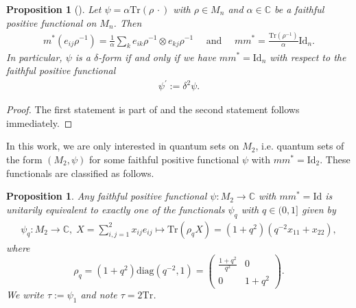 \documentclass{amsart}
\newtheorem{proposition}[thm]{Proposition}
\newcommand{\C}{\mathbb{C}}
\begin{document}
\begin{proposition}[{\cite[Proposition 2.3]{wasilewski_quantum_2024}}]
    \label{pre::prop:delta_form_versus_mm*=Id}
    Let $\psi = \alpha \mathrm{Tr}(\rho \, \cdot)$ with $\rho \in M_n$ and $\alpha \in \C$ be a faithful positive functional on $M_n$. Then
    \begin{align*}
        m^\ast(e_{ij}\rho^{-1}) = \frac{1}{\alpha} \sum_k e_{ik}\rho^{-1} \otimes e_{kj}\rho^{-1}
        \quad \text{ and } \quad
        m m^\ast = \frac{\mathrm{Tr}(\rho^{-1})}{\alpha} \mathrm{Id}_n.
    \end{align*}
    In particular, $\psi$ is a $\delta$-form if and only if we have $m m^\ast = \mathrm{Id}_n$ with respect to the faithful positive functional
    \begin{align*}
        \psi^\prime := \delta^2 \psi.
    \end{align*}
\end{proposition}

\begin{proof}
    The first statement is part of \cite[Proposition 2.3]{wasilewski_quantum_2024} and the second statement follows immediately.
\end{proof}

In this work, we are only interested in quantum sets on $M_2$, i.e. quantum sets of the form $(M_2, \psi)$ for some faithful positive functional $\psi$ with $m m^\ast = \mathrm{Id}_2$. These functionals are classified as follows.

\begin{proposition}
    \label{pre::prop:qsets_on_M2}
    Any faithful positive functional $\psi: M_2 \to \C$ with $mm^\ast = \mathrm{Id}$ is unitarily equivalent to exactly one of the functionals $\psi_q$ with $q \in (0,1]$ given by
    \begin{align*}
        \psi_q: M_2 \to \C, \; X = \sum_{i,j=1}^2 x_{ij} e_{ij} \mapsto  \mathrm{Tr}(\rho_q X) = (1+q^2)(q^{-2} x_{11} + x_{22}),
    \end{align*}
    where 
    $$
        \rho_q = (1+q^2) \mathrm{diag}(q^{-2}, 1) = \begin{pmatrix}
            \frac{1+q^2}{q^2} & 0 \\
            0 & 1+q^2
        \end{pmatrix}.
    $$
    We write $\tau := \psi_1$ and note $\tau = 2 \mathrm{Tr}$. 
\end{proposition}
\end{document}
